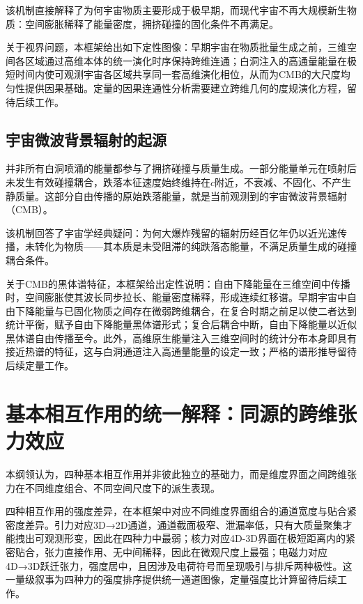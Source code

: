 \documentclass[12pt,a4paper]{ctexart}
\begin{document}
该机制直接解释了为何宇宙物质主要形成于极早期，而现代宇宙不再大规模新生物质：空间膨胀稀释了能量密度，拥挤碰撞的固化条件不再满足。

关于视界问题，本框架给出如下定性图像：早期宇宙在物质批量生成之前，三维空间各区域通过高维本体的统一演化时序保持跨维连通；白洞注入的高通量能量在极短时间内使可观测宇宙各区域共享同一套高维演化相位，从而为CMB的大尺度均匀性提供因果基础。定量的因果连通性分析需要建立跨维几何的度规演化方程，留待后续工作\cite{guth1981, linde1982}。

\subsection{宇宙微波背景辐射的起源}
并非所有白洞喷涌的能量都参与了拥挤碰撞与质量生成。一部分能量单元在喷射后未发生有效碰撞耦合，跌落本征速度始终维持在$c$附近，不衰减、不固化、不产生静质量。这部分自由传播的原始跌落能量，就是当前观测到的宇宙微波背景辐射（CMB）\cite{penzias1965, smoot1992}。

该机制回答了宇宙学经典疑问：为何大爆炸残留的辐射历经百亿年仍以近光速传播，未转化为物质——其本质是未受阻滞的纯跌落态能量，不满足质量生成的碰撞耦合条件。

关于CMB的黑体谱特征，本框架给出定性说明：自由下降能量在三维空间中传播时，空间膨胀使其波长同步拉长、能量密度稀释，形成连续红移谱。早期宇宙中自由下降能量与已固化物质之间存在微弱跨维耦合，在复合时期之前足以使二者达到统计平衡，赋予自由下降能量黑体谱形式；复合后耦合中断，自由下降能量以近似黑体谱自由传播至今。此外，高维原生能量注入三维空间时的统计分布本身即具有接近热谱的特征，这与白洞通道注入高通量能量的设定一致；严格的谱形推导留待后续定量工作\cite{planck2018, komatsu2011}。

\section{基本相互作用的统一解释：同源的跨维张力效应}
本纲领认为，四种基本相互作用并非彼此独立的基础力，而是维度界面之间跨维张力在不同维度组合、不同空间尺度下的派生表现。

四种相互作用的强度差异，在本框架中对应不同维度界面组合的通道宽度与贴合紧密度差异。引力对应3D→2D通道，通道截面极窄、泄漏率低，只有大质量聚集才能拽出可观测形变，因此在四种力中最弱；核力对应4D-3D界面在极短距离内的紧密贴合，张力直接作用、无中间稀释，因此在微观尺度上最强；电磁力对应4D→3D跃迁张力，强度居中，且因涉及电荷符号而呈现吸引与排斥两种极性。这一量级叙事为四种力的强度排序提供统一通道图像，定量强度比计算留待后续工作\cite{griffiths2005, perkins2000}。
\end{document}
